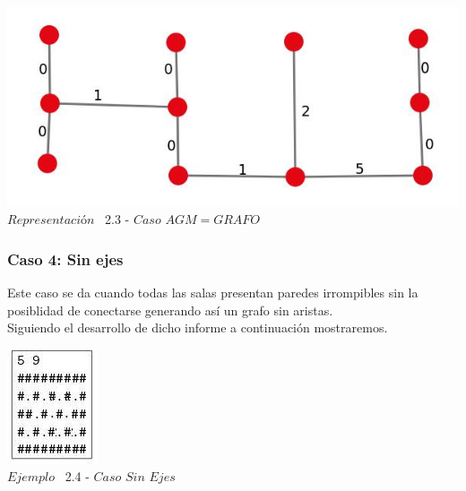 \vspace*{0.3cm} \vspace*{0.3cm}
  \begin{center}
 \includegraphics[scale=0.5]{./EJ2/ej2grafocompleto.jpeg}
 \\{$Representación$ \ 2.3 - $Caso$ $AGM = GRAFO$}
  \end{center}
  \vspace*{0.3cm}

\begin{center}
 \subsubsection*{Caso 4: Sin ejes}
\end{center}

Este caso se da cuando todas las salas presentan paredes irrompibles sin la posiblidad de conectarse generando as\'i un grafo sin aristas.\\

Siguiendo el desarrollo de dicho informe a continuaci\'on mostraremos.\\
 
\vspace*{0.3cm} \vspace*{0.3cm}
  \begin{center}
 \includegraphics[scale=1.6]{./EJ2/ej2sinejes.jpeg}
\\ {$Ejemplo$ \ 2.4 - $Caso$ $Sin$ $Ejes$}
  \end{center}
  \vspace*{0.3cm}

